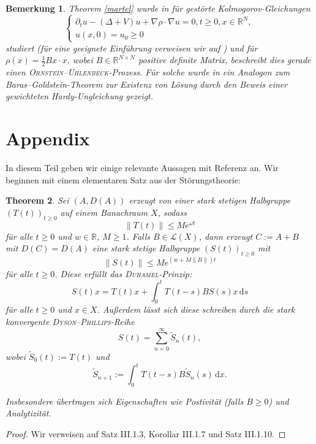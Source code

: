 \documentclass[11pt,twoside,a4paper]{article}
\newtheorem{thm}{Theorem}
\theoremstyle{break}
\newtheorem{nt}[thm]{Bemerkung}
\begin{document}
\begin{nt}
Theorem \ref{martel} wurde in \cite{goldstein-rhandi} für gestörte Kolmogorov-Gleichungen
\begin{equation}%
\begin{cases}
\partial_t u - (\Delta+V) u +\nabla \rho \cdot \nabla u=0, t\ge 0, x\in \mathbb R^N,\\
u(x,0)=u_0 \ge 0
\end{cases}
\end{equation}
studiert (für eine geeignete Einführung verweisen wir auf \cite{lorenzi}) und für $\rho(x)=\frac{1}{2} Bx\cdot x$, wobei $B\in \mathbb R^{N\times N}$ positive definite Matrix, beschreibt dies gerade einen \textsc{Ornstein--Uhlenbeck}-Prozess.  Für solche wurde in \cite{goldstein-rhandi} ein Analogon zum Baras--Goldstein-Theorem zur Existenz von Lösung durch den Beweis einer gewichteten Hardy-Ungleichung gezeigt.
\end{nt}
\appendix
\section{Appendix}
In diesem Teil geben wir einige relevante Aussagen mit Referenz an.  Wir beginnen mit einem elementaren Satz aus der Störungstheorie:

\vspace{.25cm}

\begin{thm}\label{bounded}
Sei $(A, D(A))$ erzeugt von einer stark stetigen Halbgruppe $(T(t))_{t\ge 0}$ auf einem Banachraum $X$, sodass
\begin{equation}
\|T(t)\|\le M e^{\omega t}
\end{equation}
f\"ur alle $t\ge 0$ und $w\in \mathbb R$, $M\ge 1$. Falls $B\in \mathcal L(X)$, dann erzeugt $C:=A+B$ mit $D(C)=D(A)$ eine stark stetige Halbgruppe $(S(t))_{t\ge 0}$ mit
\begin{equation}
\|S(t)\|\le M e^{(w+ M\|B\|) t}
\end{equation}
f\"ur alle $t\ge 0$. Diese erf\"ullt das \emph{\textsc{Duhamel}-Prinzip}:
\begin{equation}\label{duhamel}
S(t) x = T(t) x + \int_0^t T(t-s) B S(s) x \,\mathrm ds
\end{equation}
f\"ur alle $t\ge 0$ und $x\in X$. 
Außerdem lässt sich diese schreiben durch die stark konvergente \textsc{Dyson--Phillips}-Reihe
\begin{equation}
S(t)=\sum_{n=0}^\infty \tilde S_n(t),
\end{equation}
wobei $\tilde S_0(t):=T(t)$ und
\begin{equation}
\tilde S_{n+1} := \int_0^t T(t-s) B\tilde S_n(s)\, \mathrm dx.
\end{equation}

Insbesondere \"ubertragen sich Eigenschaften wie Postivit\"at (falls $B\ge 0$) und Analytizit\"at.
\end{thm}
\begin{proof}
Wir verweisen auf \cite{engel-nagel} Satz III.1.3, Korollar III.1.7 und Satz III.1.10. 
\end{proof}
\end{document}
